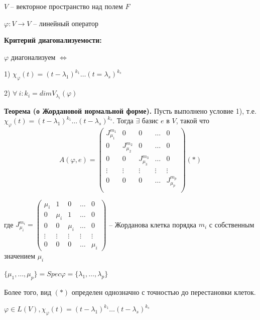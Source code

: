 $V$ -- векторное пространство над полем $F$

$\varphi: V \rightarrow V$ -- линейный оператор

\vspace{\baselineskip}
\textbf{\textbf{Критерий диагонализуемости:}}

$\varphi$ диагонализуем $\Leftrightarrow$

1) $\chi_{\varphi} (t) = (t - \lambda_1)^{k_1} \dots (t = \lambda_s)^{k_s}$

2) $\forall \ i: k_i = dim V_{\lambda_i} (\varphi)$

\vspace{\baselineskip}
\textbf{Теорема (о Жордановой нормальной форме).} Пусть выполнено условие 1), т.е. $\chi_{\varphi} (t) = (t - \lambda_1)^{k_1} \dots (t - \lambda_s)^{k_s}$. Тогда $\exists$ базис $e$ в $V$, такой что \begin{equation*}A(\varphi, e) = \left(
\begin{array}{c|c|c|c|c}
  J^{m_1}_{\mu_1} & 0 & 0 & \dots & 0  \\
  \hline
  0 & J^{m_2}_{\mu_2} & 0 & \dots & 0  \\
  \hline
  0 & 0 & J^{m_3}_{\mu_3} & \dots & 0 \\
  \hline
  \vdots & \vdots & \vdots & \vdots & \vdots \\
  \hline
  0 & 0 & 0 & \dots & J^{m_p}_{\mu_p} \\
\end{array}
\right) (*)\end{equation*}

где $J^{m_i}_{\mu_i} = \begin{pmatrix} \mu_i & 1 & 0 & \dots & 0 \\ 0 & \mu_i & 1 & \dots & 0 \\ 0 & 0 & \mu_i & \dots & 0
\\ \vdots & \vdots & \vdots & \vdots & \vdots \\ 0 & 0 & 0 & \dots & \mu_i \end{pmatrix}$ -- Жорданова клетка порядка $m_i$ с собственным значением $\mu_i$

$\{\mu_1, \dots, \mu_p\} = Spec \varphi = \{\lambda_1, \dots, \lambda_p\}$

\vspace{\baselineskip}
Более того, вид $(*)$ определен однозначно с точностью до перестановки клеток.

\vspace{\baselineskip}
$\varphi \in L(V), \chi_{\varphi} (t) = (t - \lambda_1)^{k_1} \dots (t - \lambda_s)^{k_s}$

